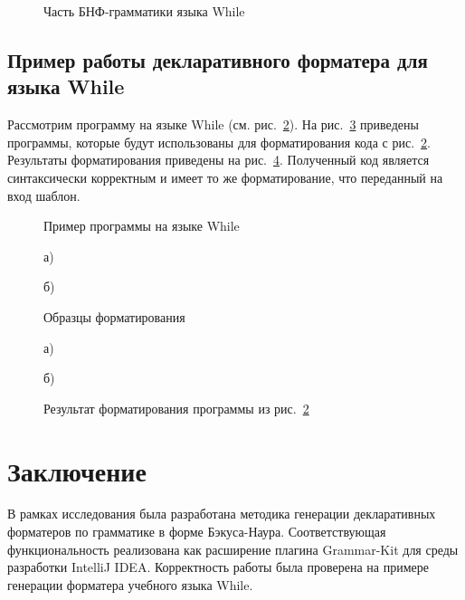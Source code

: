 \documentclass[conference]{IEEEtran}
\begin{document}
\begin{figure}[h]
	\centering
	
	\caption{Часть БНФ-грамматики языка While}
	\label{whileBnf}
\end{figure}

\subsection{Пример работы декларативного форматера для языка While}
Рассмотрим программу на языке While (см. рис.~\ref{whileProg}).
На рис.~\ref{whileTs} приведены программы, которые будут
использованы для форматирования кода с рис.~\ref{whileProg}.
Результаты форматирования приведены на рис.~\ref{whileRes}.
Полученный код является синтаксически корректным и имеет то же форматирование, что переданный на вход шаблон.

\begin{figure}[h]
	\centering
	
	\caption{Пример программы на языке While}
	\label{whileProg}
\end{figure}

\begin{figure}[ht]
\noindent\begin{minipage}{.2\textwidth}
    
\caption*{а)}    
\end{minipage}\hfill
\begin{minipage}{.2\textwidth}
    
\caption*{б)}    
\end{minipage}
\caption{Образцы форматирования}    
\label{whileTs}
\end{figure}

\begin{figure}[ht]
\noindent\begin{minipage}{.2\textwidth}
    
\caption*{а)}    
\end{minipage}\hfill
\begin{minipage}{.2\textwidth}
    
\caption*{б)}    
\end{minipage}
\caption{Результат форматирования программы из рис.~\ref{whileProg}}
\label{whileRes}
\end{figure}

\section{Заключение}
В рамках исследования была разработана методика генерации декларативных
форматеров по грамматике в форме Бэкуса-Наура.
Соответствующая функциональность реализована как расширение плагина
Grammar-Kit для среды разработки IntelliJ IDEA.
Корректность работы была проверена на примере генерации форматера
учебного языка While.
\end{document}

